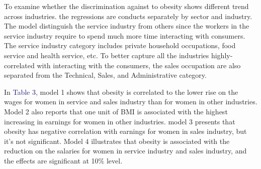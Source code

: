 \documentclass{article}
\begin{document}
\par
\setlength{\parindent}{2em}
To examine whether the discrimination against to obesity shows different trend across industries. the regressions are conducts separately by sector and industry. The model distinguish the service industry from others since the workers in the service industry require to spend much more time interacting with consumers. The service industry category includes private household occupations, food service and health service, etc. To better capture all the industries highly-correlated with interacting with the consumers, the sales occupation are also separated from the Technical, Sales, and Administrative category.  
\par
\setlength{\parindent}{2em}
In \textcolor{MidnightBlue}{Table 3}, model 1 shows that obesity is correlated to the lower rise on the wages for women in service and sales industry than for women in other industries. Model 2 also reports that one unit of BMI is associated with the highest increasing in earnings for women in other industries. model 3 presents that obesity has negative correlation with earnings for women in sales industry, but it's not significant. Model 4 illustrates that obesity is associated with the reduction on the salaries for women in service industry and sales industry, and the effects are significant at 10\% level.


\par
\setlength{\parindent}{2em}
\end{document}
